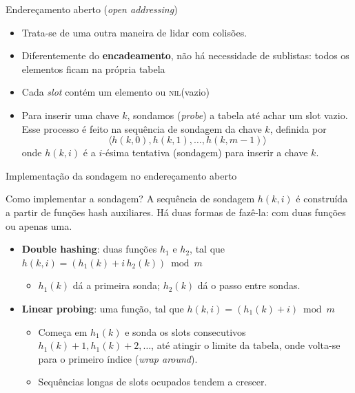 \documentclass[aspectratio=169,10pt]{beamer}
\newcommand{\NIL}{\textnormal{\rmfamily\textsc{nil}}}
\begin{document}
\begin{frame}{Endereçamento aberto (\emph{open addressing})}
  \begin{itemize}
    \item Trata-se de uma outra maneira de lidar com colisões.
    \item Diferentemente do \textbf{encadeamento}, não há necessidade de sublistas: todos os elementos ficam \alert{na própria tabela}
    \item Cada \textit{slot} contém um elemento ou \NIL (vazio)
    \item Para inserir uma chave $k$, \alert{sondamos} (\emph{probe}) a tabela até achar um slot vazio.
          Esse processo é feito na sequência de sondagem da chave $k$, definida por
          $$\langle h(k,0), h(k,1), \dots, h(k,m-1)\rangle$$ onde $h(k,i)$ é a $i$-ésima tentativa (sondagem) para inserir a chave $k$.
  \end{itemize}
\end{frame}

\begin{frame}{Implementação da sondagem no endereçamento aberto}
  \begin{block}{Como implementar a sondagem?}
    A sequência de sondagem $h(k,i)$ é construída a partir de funções hash auxiliares. Há duas formas de fazê-la: com \alert{duas} funções ou apenas uma.
  \end{block}
  \begin{itemize}
    \item \textbf{Double hashing}: duas funções $h_1$ e $h_2$, tal que $h(k,i) = (h_1(k) + i\,h_2(k)) \bmod m$
      \begin{itemize}\small
        \item $h_1(k)$ dá a primeira sonda; $h_2(k)$ dá o \alert{passo} entre sondas.
      \end{itemize}
    \item \textbf{Linear probing}: uma função, tal que $h(k,i) = (h_1(k) + i) \bmod m$
      \begin{itemize}\small
        \item Começa em $h_1(k)$ e sonda os slots \alert{consecutivos}
              $h_1(k)+1, h_1(k)+2, \dots$, até atingir o limite da tabela, onde volta-se para o primeiro índice (\emph{wrap around}).
        \item Sequências longas de slots ocupados tendem a crescer.
      \end{itemize}
  \end{itemize}
\end{frame}
\end{document}
